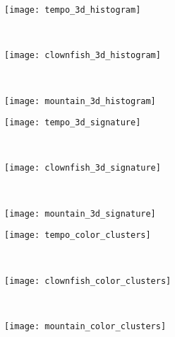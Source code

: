 \begin{figure}[!ht]
    \begin{subfigure}[t]{\textwidth+20pt\relax}
    	\texttt{[image: tempo\_3d\_histogram]}
    \end{subfigure}~ 
    \begin{subfigure}[b]{0.32\textwidth}
        \texttt{[image: clownfish\_3d\_histogram]}
    \end{subfigure}~
    \begin{subfigure}[b]{0.32\textwidth}
        \texttt{[image: mountain\_3d\_histogram]}
    \end{subfigure}\vspace{10pt}
    
    \begin{subfigure}[t]{\textwidth+20pt\relax}
    	\texttt{[image: tempo\_3d\_signature]}
    \end{subfigure}~ 
    \begin{subfigure}[b]{0.32\textwidth}
        \texttt{[image: clownfish\_3d\_signature]}
    \end{subfigure}~
    \begin{subfigure}[b]{0.32\textwidth}
        \texttt{[image: mountain\_3d\_signature]}
    \end{subfigure}\vspace{10pt}
    
    \begin{subfigure}[t]{\textwidth+20pt\relax}
    	\texttt{[image: tempo\_color\_clusters]}
    \end{subfigure}~ 
    \begin{subfigure}[b]{0.32\textwidth}
        \texttt{[image: clownfish\_color\_clusters]}
    \end{subfigure}~
    \begin{subfigure}[b]{0.32\textwidth}
        \texttt{[image: mountain\_color\_clusters]}
    \end{subfigure}\vspace{-5pt}
    

\end{figure}
